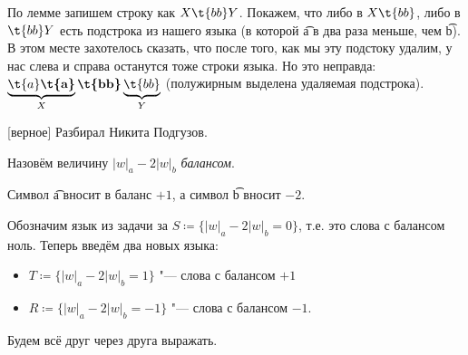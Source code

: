 	По лемме запишем строку как $X\t{bb}Y$.
	Покажем, что либо в $X\t{bb}$, либо в $\t{bb}Y$ есть подстрока из нашего языка
	(в которой \t{a} в два раза меньше, чем \t{b}).
	В этом месте захотелось сказать, что после того, как мы эту подстоку удалим,
	у нас слева и справа останутся тоже строки языка.
	Но это неправда: $\underbrace{\t{a}\textbf{\t{a}}}_{X}\textbf{\t{bb}}\underbrace{\t{bb}}_{Y}$
	(полужирным выделена удаляемая подстрока).

[верное]\label{prob22f}
	Разбирал Никита Подгузов.

	\begin{Def}
		Назовём величину $|w|_a - 2|w|_b$ \textit{балансом}.
	\end{Def}
	\begin{Rem}
		Символ \t{a} вносит в баланс $+1$, а символ \t{b} вносит $-2$.
	\end{Rem}
	Обозначим язык из задачи за $S \coloneq \{ |w|_a - 2|w|_b = 0 \}$, т.е. это слова с балансом ноль.
	Теперь введём два новых языка:
	\begin{itemize}
		\item $T \coloneq \{ |w|_a - 2|w|_b = 1 \}$ "--- слова с балансом $+1$
		\item $R \coloneq \{ |w|_a - 2|w|_b = -1 \}$ "--- слова с балансом $-1$.
	\end{itemize}
	Будем всё друг через друга выражать.
	
